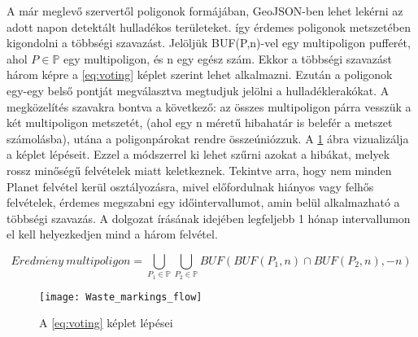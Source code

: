 A már meglevő szervertől poligonok formájában, GeoJSON-ben \cite{rfc7946} lehet lekérni az adott napon detektált hulladékos területeket. így érdemes poligonok metszetében kigondolni a többségi szavazást. Jelöljük BUF(P,n)-vel egy multipoligon pufferét, ahol $P \in \mathbb{P}$ egy multipoligon, és n egy egész szám. Ekkor a többségi szavazást három képre a \ref{eq:voting}  képlet szerint lehet alkalmazni. Ezután a poligonok egy-egy belső pontját megválasztva megtudjuk jelölni a hulladéklerakókat. A megközelítés szavakra bontva a következő: az összes multipoligon párra vesszük a két multipoligon metszetét, (ahol egy n méretű hibahatár is belefér a metszet számolásba), utána a poligonpárokat rendre összeúniózzuk. A \ref{fig:union-intersection} ábra vizualizálja a képlet lépéseit. Ezzel a módszerrel ki lehet szűrni azokat a hibákat, melyek rossz minőségű felvételek miatt keletkeznek. Tekintve arra, hogy nem minden Planet felvétel kerül osztályozásra, mivel előfordulnak hiányos vagy felhős felvételek, érdemes megszabni egy időintervallumot, amin belül alkalmazható a többségi szavazás. A dolgozat írásának idejében legfeljebb 1 hónap intervallumon el kell helyezkedjen mind a három felvétel.

\begin{equation}\label{eq:voting}
    Eredm\acute{e}ny \ multipoligon = \bigcup_{P_1 \in \mathbb{P}} \bigcup_{P_2 \in \mathbb{P}} BUF(BUF(P_1,n) \cap BUF(P_2,n),-n)
\end{equation}

\begin{figure}[H]
	\centering
	\texttt{[image: Waste\_markings\_flow]}
	\caption{A \ref{eq:voting} képlet lépései}
    \label{fig:union-intersection}
\end{figure}